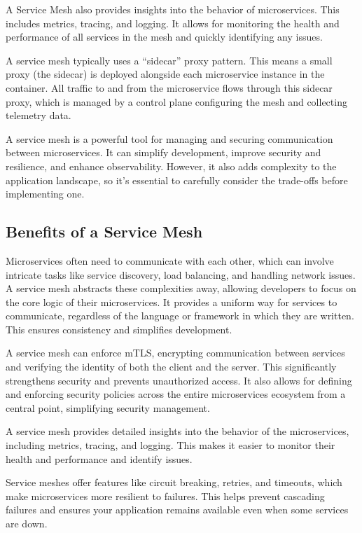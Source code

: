 A Service Mesh also provides insights into the behavior of
microservices. This includes metrics, tracing, and logging. It allows
for monitoring the health and performance of all services in the mesh
and quickly identifying any issues.

A service mesh typically uses a ``sidecar'' proxy pattern. This means a
small proxy (the sidecar) is deployed alongside each microservice
instance in the container. All traffic to and from the microservice
flows through this sidecar proxy, which is managed by a control plane
configuring the mesh and collecting telemetry data.

A service mesh is a powerful tool for managing and securing
communication between microservices. It can simplify development,
improve security and resilience, and enhance observability. However, it
also adds complexity to the application landscape, so it's essential to
carefully consider the trade-offs before implementing one.

\subsection{Benefits of a Service Mesh}

Microservices often need to communicate with each other, which can
involve intricate tasks like service discovery, load balancing, and
handling network issues. A service mesh abstracts these complexities
away, allowing developers to focus on the core logic of their
microservices. It provides a uniform way for services to communicate,
regardless of the language or framework in which they are written. This
ensures consistency and simplifies development.

A service mesh can enforce mTLS, encrypting communication between
services and verifying the identity of both the client and the server.
This significantly strengthens security and prevents unauthorized
access. It also allows for defining and enforcing security policies
across the entire microservices ecosystem from a central point,
simplifying security management.

A service mesh provides detailed insights into the behavior of the
microservices, including metrics, tracing, and logging. This makes it
easier to monitor their health and performance and identify issues.

Service meshes offer features like circuit breaking, retries, and
timeouts, which make microservices more resilient to failures. This
helps prevent cascading failures and ensures your application remains
available even when some services are down.

